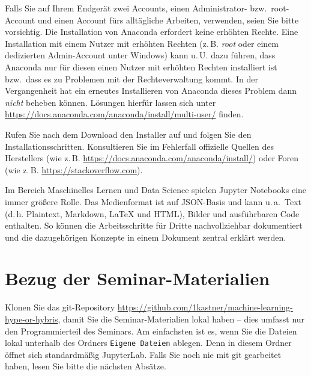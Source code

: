 \documentclass{tufte-handout}
\begin{document}
Falls Sie auf Ihrem Endgerät zwei Accounts, einen Administrator- bzw.\ root-Account und einen Account fürs alltägliche Arbeiten, verwenden, seien Sie bitte vorsichtig.
Die Installation von Anaconda erfordert keine erhöhten Rechte.
Eine Installation mit einem Nutzer mit erhöhten Rechten (z.\,B. \emph{root} oder einem dedizierten Admin-Account unter Windows) kann u.\,U. dazu führen, dass Anaconda nur für diesen einen Nutzer mit erhöhten Rechten installiert ist bzw.\ dass es zu Problemen mit der Rechteverwaltung kommt.
In der Vergangenheit hat ein erneutes Installieren von Anaconda dieses Problem dann \emph{nicht} beheben können.
Lösungen hierfür lassen sich unter \url{https://docs.anaconda.com/anaconda/install/multi-user/} finden. 

Rufen Sie nach dem Download den Installer auf und folgen Sie den Installationsschritten.
Konsultieren Sie im Fehlerfall offizielle Quellen des Herstellers (wie z.\,B. \url{https://docs.anaconda.com/anaconda/install/})
oder Foren (wie z.\,B. \url{https://stackoverflow.com}).


Im Bereich Maschinelles Lernen und Data Science spielen Jupyter Notebooks eine immer größere Rolle.
Das Medienformat ist auf JSON-Basis und kann u.\,a.\
Text (d.\,h. Plaintext, Markdown, LaTeX und HTML),
Bilder und
ausführbaren Code enthalten.
So können die Arbeitsschritte für Dritte nachvollziehbar dokumentiert und die dazugehörigen Konzepte in einem Dokument zentral erklärt werden.


\section{Bezug der Seminar-Materialien}
\label{sec:git-clone}

Klonen Sie das git-Repository
\url{https://github.com/1kastner/machine-learning-hype-or-hybris},
damit Sie die Seminar-Materialien lokal haben -- dies umfasst nur den Programmierteil des Seminars.
Am einfachsten ist es, wenn Sie die Dateien lokal unterhalb des Ordners \texttt{Eigene Dateien} ablegen.
Denn in diesem Ordner öffnet sich standardmäßig JupyterLab.
Falls Sie noch nie mit git gearbeitet haben, lesen Sie bitte die nächsten Absätze.
\end{document}
